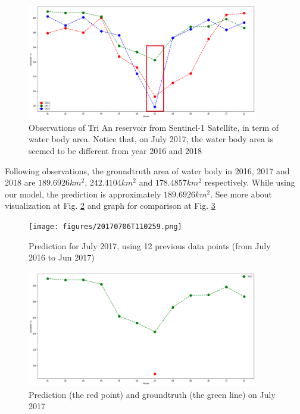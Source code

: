 \begin{figure}[h!]
	\centering
	\includegraphics[width=0.9\textwidth]{figures/observations.png}
	\caption[]{Observations of Tri An reservoir from Sentinel-1 Satellite, in term of water body area. Notice that, on July 2017, the water body area is seemed to be different from year 2016 and 2018}
	\label{fig:observation}
\end{figure}

Following observations, the groundtruth area of water body in 2016, 2017 and 2018 are $189.6926 km^2$, $242.4104 km^2$ and $178.4857 km^2$ respectively. While using our model, the prediction is approximately $189.6926 km^2$. See more about visualization at Fig. \ref{fig:anomalyVis} and graph for comparison at Fig. \ref{fig:anomalyComp}

\begin{figure}[h!]
	\centering
	\texttt{[image: figures/20170706T110259.png]}
	\caption[]{Prediction for July 2017, using 12 previous data points (from July 2016 to Jun 2017)}
	\label{fig:anomalyVis}
\end{figure}


\begin{figure}[h!]
	\centering
	\includegraphics[width=0.9\textwidth]{figures/anomaly.png}
	\caption[]{Prediction (the red point) and groundtruth (the green line) on July 2017}
	\label{fig:anomalyComp}
\end{figure}


